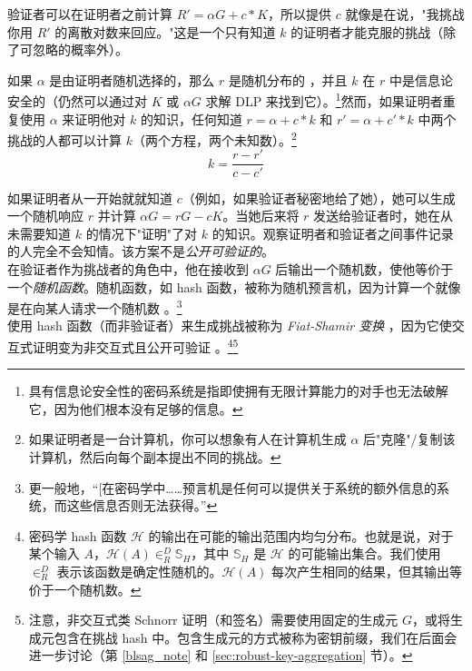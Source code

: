 验证者可以在证明者之前计算 $R' = \alpha G + c*K$，所以提供 $c$ 就像是在说，"我挑战你用 $R'$ 的离散对数来回应。"这是一个只有知道 $k$ 的证明者才能克服的挑战（除了可忽略的概率外）。

如果 $\alpha$ 是由证明者随机选择的，那么 $r$ 是随机分布的 \cite{SCOZZAFAVA1993313}，并且 $k$ 在 $r$ 中是信息论安全的（仍然可以通过对 $K$ 或 $\alpha G$ 求解 DLP 来找到它）。\footnote{\label{information_theoretic_note}具有信息论安全性的密码系统是指即使拥有无限计算能力的对手也无法破解它，因为他们根本没有足够的信息。}然而，如果证明者重复使用 $\alpha$ 来证明他对 $k$ 的知识，任何知道 $r = \alpha + c*k$ 和 $r' = \alpha + c'*k$ 中两个挑战的人都可以计算 $k$（两个方程，两个未知数）。\footnote{如果证明者是一台计算机，你可以想象有人在计算机生成 $\alpha$ 后"克隆"/复制该计算机，然后向每个副本提出不同的挑战。}\vspace{.175cm}%
\[k = \frac{r-r'}{c-c'}\]

如果证明者从一开始就就知道 $c$（例如，如果验证者秘密地给了她），她可以生成一个随机响应 $r$ 并计算 $\alpha G = r G - c K$。当她后来将 $r$ 发送给验证者时，她在从未需要知道 $k$ 的情况下"证明"了对 $k$ 的知识。观察证明者和验证者之间事件记录的人完全不会知情。该方案不是{\em 公开可验证的}。\cite{Signatures2015BorromeanRS}\\

在验证者作为挑战者的角色中，他在接收到 $\alpha G$ 后输出一个随机数，使他等价于一个{\em 随机函数}。随机函数，如 hash 函数，被称为随机预言机，因为计算一个就像是在向某人请求一个随机数 \cite{Signatures2015BorromeanRS}。\footnote{更一般地，``[在密码学中……预言机是任何可以提供关于系统的额外信息的系统，而这些信息否则无法获得。''\cite{cryptographic-oracle}}\\

使用 hash 函数（而非验证者）来生成挑战被称为 {\em Fiat-Shamir 变换} \cite{fiat-shamir-transform}，因为它使交互式证明变为非交互式且公开可验证 \cite{Signatures2015BorromeanRS}。\footnote{密码学 hash 函数 $\mathcal{H}$ 的输出在可能的输出范围内均匀分布。也就是说，对于某个输入 $A$，$\mathcal{H}(A) \in^D_R \mathbb{S}_H$，其中 $\mathbb{S}_H$ 是 $\mathcal{H}$ 的可能输出集合。我们使用 $\in^D_R$ 表示该函数是确定性随机的。$\mathcal{H}(A)$ 每次产生相同的结果，但其输出等价于一个随机数。
}\footnote{注意，非交互式类 Schnorr 证明（和签名）需要使用固定的生成元 $G$，或将生成元包含在挑战 hash 中。包含生成元的方式被称为密钥前缀，我们在后面会进一步讨论（第 \ref{blsag_note} 和 \ref{sec:robust-key-aggregation} 节）。}

